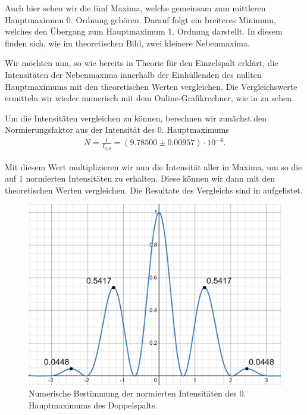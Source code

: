 Auch hier sehen wir die fünf Maxima, welche gemeinsam zum mittleren Hauptmaximum 0. Ordnung gehören. Darauf folgt ein breiteres Minimum, welches den Übergang zum Hauptmaximum 1. Ordnung darstellt. In diesem finden sich, wie im theoretischen Bild, zwei kleinere Nebenmaxima.

Wir möchten nun, so wie bereits in Theorie für den Einzelspalt erklärt, die Intensitäten der Nebenmaxima innerhalb der Einhüllenden des nullten Hauptmaximums mit den theoretischen Werten vergleichen. Die Vergleichswerte ermitteln wir wieder numerisch mit dem Online-Grafikrechner, wie in  zu sehen.

Um die Intensitäten vergleichen zu können, berechnen wir zunächst den Normierungsfaktor aus der Intensität des 0. Hauptmaximums
\begin{align}
  N = \frac{1}{I_{0,0}} = (9.78500 \pm 0.00957) \cdot 10^{-4}.
\end{align}

Mit diesem Wert multiplizieren wir nun die Intensität aller in  Maxima, um so die auf 1 normierten Intensitäten zu erhalten. Diese können wir dann mit den theoretischen Werten vergleichen. Die Resultate des Vergleichs sind in  aufgelistet.


\begin{figure}[H]
  \centering
  \includegraphics[width=.9\textwidth]{files/plots/3/ds_intensitaeten_desmos.png}
  \caption{Numerische Bestimmung der normierten Intensitäten des 0. Hauptmaximums des Doppelspalts.}
  \label{fig:ds_intensitaeten_desmos}
\end{figure}


